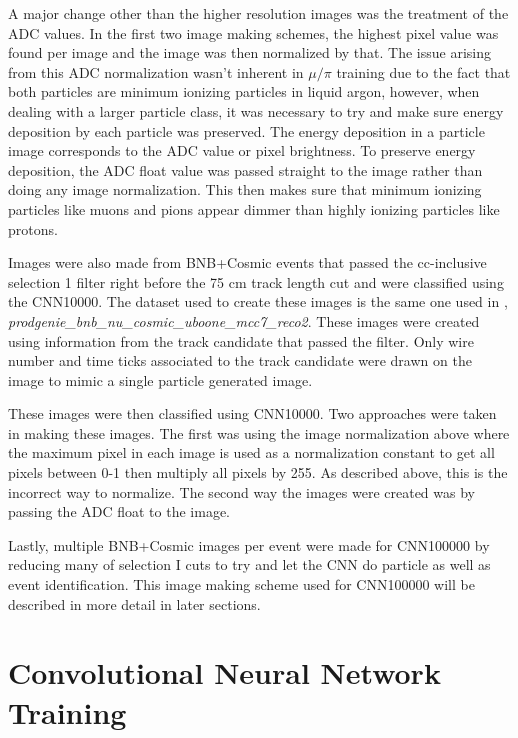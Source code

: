 A major change other than the higher resolution images was the treatment of the ADC values. In the first two image making schemes, the highest pixel value was found per image and the image was then normalized by that. The issue arising from this ADC normalization wasn't inherent in $\mu/\pi$ training due to the fact that both particles are minimum ionizing particles in liquid argon, however, when dealing with a larger particle class, it was necessary to try and make sure energy deposition by each particle was preserved. The energy deposition in a particle image corresponds to the ADC value or pixel brightness. To preserve energy deposition, the ADC float value was passed straight to the image rather than doing any image normalization. This then makes sure that minimum ionizing particles like muons and pions appear dimmer than highly ionizing particles like protons.  

Images were also made from BNB+Cosmic events that passed the cc-inclusive selection 1 filter right before the 75 cm track length cut and were classified using the CNN10000. The dataset used to create these images is the same one used in \cite{cc-inclusive}, \textit{prodgenie{\_}bnb{\_}nu{\_}cosmic{\_}uboone{\_}mcc7{\_}reco2}. These images were created using information from the track candidate that passed the filter. Only wire number and time ticks associated to the track candidate were drawn on the image to mimic a single particle generated image. 

These images were then classified using CNN10000. Two approaches were taken in making these images. The first was using the image normalization above where the maximum pixel in each image is used as a normalization constant to get all pixels between 0-1 then multiply all pixels by 255. As described above, this is the incorrect way to normalize. The second way the images were created was by passing the ADC float to the image. 

Lastly, multiple BNB+Cosmic images per event were made for CNN100000 by reducing many of selection I cuts to try and let the CNN do particle as well as event identification. This image making scheme used for CNN100000 will be described in more detail in later sections. 

\section{Convolutional Neural Network Training}
